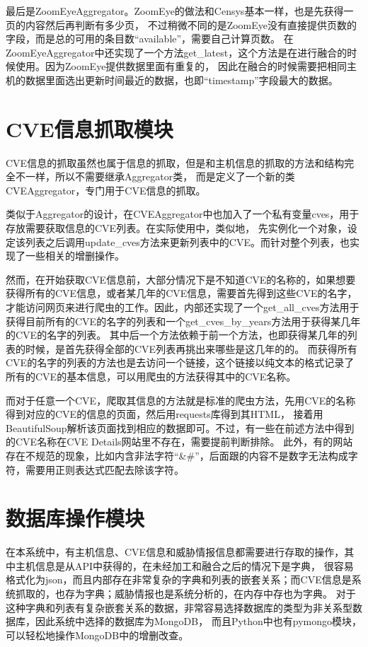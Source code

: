 最后是ZoomEyeAggregator。ZoomEye的做法和Censys基本一样，也是先获得一页的内容然后再判断有多少页，
不过稍微不同的是ZoomEye没有直接提供页数的字段，而是总的可用的条目数“available”，需要自己计算页数。
在ZoomEyeAggregator中还实现了一个方法get\_latest，这个方法是在进行融合的时候使用。因为ZoomEye提供数据里面有重复的，
因此在融合的时候需要把相同主机的数据里面选出更新时间最近的数据，也即“timestamp”字段最大的数据。

\section{CVE信息抓取模块}
\label{sec:CVE-module}

CVE信息的抓取虽然也属于信息的抓取，但是和主机信息的抓取的方法和结构完全不一样，所以不需要继承Aggregator类，
而是定义了一个新的类CVEAggregator，专门用于CVE信息的抓取。

类似于Aggregator的设计，在CVEAggregator中也加入了一个私有变量cves，用于存放需要获取信息的CVE列表。在实际使用中，类似地，
先实例化一个对象，设定该列表之后调用update\_cves方法来更新列表中的CVE。而针对整个列表，也实现了一些相关的增删操作。

然而，在开始获取CVE信息前，大部分情况下是不知道CVE的名称的，如果想要获得所有的CVE信息，或者某几年的CVE信息，需要首先得到这些CVE的名字，
才能访问网页来进行爬虫的工作。因此，内部还实现了一个get\_all\_cves方法用于获得目前所有的CVE的名字的列表和一个get\_cves\_by\_years方法用于获得某几年的CVE的名字的列表。
其中后一个方法依赖于前一个方法，也即获得某几年的列表的时候，是首先获得全部的CVE列表再挑出来哪些是这几年的的。
而获得所有CVE的名字的列表的方法也是去访问一个链接，这个链接以纯文本的格式记录了所有的CVE的基本信息，可以用爬虫的方法获得其中的CVE名称。

而对于任意一个CVE，爬取其信息的方法就是标准的爬虫方法，先用CVE的名称得到对应的CVE的信息的页面，然后用requests库得到其HTML，
接着用BeautifulSoup解析该页面找到相应的数据即可。不过，有一些在前述方法中得到的CVE名称在CVE Details网站里不存在，需要提前判断排除。
此外，有的网站存在不规范的现象，比如内含非法字符“\&\#”，后面跟的内容不是数字无法构成字符，需要用正则表达式匹配去除该字符。

\section{数据库操作模块}
\label{sec:database-module}

在本系统中，有主机信息、CVE信息和威胁情报信息都需要进行存取的操作，其中主机信息是从API中获得的，在未经加工和融合之后的情况下是字典，
很容易格式化为json，而且内部存在非常复杂的字典和列表的嵌套关系；而CVE信息是系统抓取的，也存为字典；威胁情报也是系统分析的，在内存中存也为字典。
对于这种字典和列表有复杂嵌套关系的数据，非常容易选择数据库的类型为非关系型数据库，因此系统中选择的数据库为MongoDB，
而且Python中也有pymongo模块，可以轻松地操作MongoDB中的增删改查。

